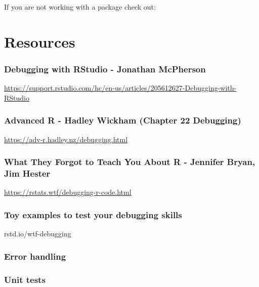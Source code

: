 \documentclass[]{book}
\begin{document}
If you are not working with a package check out:

\hypertarget{resources}{%
\chapter{Resources}\label{resources}}

\hypertarget{debugging-with-rstudio---jonathan-mcpherson}{%
\subsection{Debugging with RStudio - Jonathan McPherson}\label{debugging-with-rstudio---jonathan-mcpherson}}

\url{https://support.rstudio.com/hc/en-us/articles/205612627-Debugging-with-RStudio}

\hypertarget{advanced-r---hadley-wickham-chapter-22-debugging}{%
\subsection{Advanced R - Hadley Wickham (Chapter 22 Debugging)}\label{advanced-r---hadley-wickham-chapter-22-debugging}}

\url{https://adv-r.hadley.nz/debugging.html}

\hypertarget{what-they-forgot-to-teach-you-about-r---jennifer-bryan-jim-hester}{%
\subsection{What They Forgot to Teach You About R - Jennifer Bryan, Jim Hester}\label{what-they-forgot-to-teach-you-about-r---jennifer-bryan-jim-hester}}

\url{https://rstats.wtf/debugging-r-code.html}

\hypertarget{toy-examples-to-test-your-debugging-skills}{%
\subsection{Toy examples to test your debugging skills}\label{toy-examples-to-test-your-debugging-skills}}

rstd.io/wtf-debugging

\hypertarget{error-handling-1}{%
\subsection{Error handling}\label{error-handling-1}}

\hypertarget{unit-tests}{%
\subsection{Unit tests}\label{unit-tests}}
\end{document}
